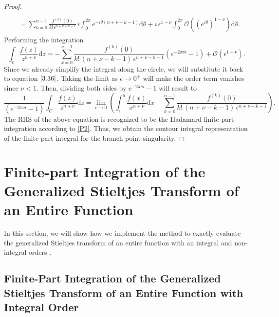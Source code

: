 \begin{proof}
\begin{align}
\begin{split}
	\\& =  \sum_{k=0}^{n-1}\frac{f^{(k)}(0)}{k!\,\epsilon^{n+\nu-k-1}}\,i\int_{0}^{2\pi} e^{-i\theta(n+\nu-k-1)}\mathrm{d}\theta + i\,\epsilon^{1-\nu} \int_{0}^{2\pi}\mathcal{O}\left(\left( e^{i\theta}\right)^{1-\nu}\right)\mathrm{d}\theta.
\end{split}
\end{align}
Performing the integration
\begin{equation}
	\int_{\epsilon}\frac{f(z)}{z^{n+\nu}}\mathrm{d}z = -\sum_{k=0}^{n-1}\frac{f^{(k)}(0)}{k!\,\left(n+\nu-k-1\right)\,\epsilon^{n+\nu-k-1}}\left(e^{-2\pi\nu i}-1\right) + \mathcal{O}(\epsilon^{1-\nu}).
	\label{3.39}
\end{equation}
Since we already simplify the integral along the circle, we will substitute it back to equation $\eqref{3.36}$. Taking the limit as $\epsilon \to 0^{+}$ will make the order term vanishes since $\nu < 1$. Then, dividing both sides by $\mathrm{e}^{-2 \pi \nu i} -1$ will result to
	\begin{equation}
		\frac{1}{\left(e^{-2\pi\nu i}-1\right)}\int_{C}\frac{f(z)}{z^{n+\nu}}\mathrm{d}z =\lim_{\epsilon\to 0}\left( \int_{\epsilon}^{a}\frac{f(x)}{x^{n+\nu}}\mathrm{d}x -\sum_{k=0}^{n-1}\frac{f^{(k)}(0)}{k!\,\left(n+\nu-k-1\right)\,\epsilon^{n+\nu-k-1}}\right).
	\end{equation}
The RHS of the above equation is recognized to be the Hadamard finite-part integration according to \eqref{P2}. Thus, we obtain the contour integral representation of the finite-part integral for the branch point singularity. 
\end{proof}


\section{Finite-part  Integration  of  the  Generalized  Stieltjes  Transform  of an Entire  Function}

In this section, we will show how we implement the method to exactly evaluate the generalized Stieltjes transform of an entire function with an integral \cite{tica2018finite} and non-integral orders \cite{tica2019finite}.

\subsection{Finite-Part Integration of the Generalized Stieltjes Transform of an Entire Function with Integral Order}



